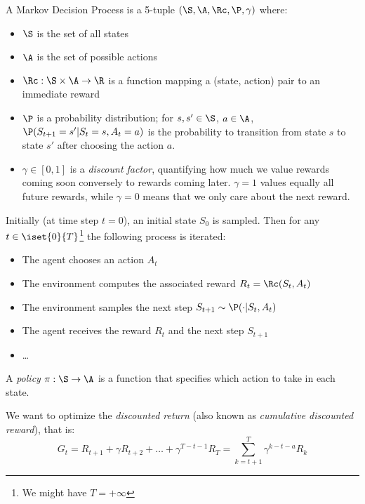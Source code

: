\begin{definition}
    A Markov Decision Process is a 5-tuple $(\S, \A, \Rc, \P, \gamma)$ where:
    \begin{itemize}
        \item $\S$ is the set of all states
        \item $\A$ is the set of possible actions
        \item $\Rc:\S\times\A\to\R$ is a function mapping a (state, action) pair to an immediate reward
        \item $\P$ is a probability distribution; for $s,s'\in\S$, $a\in\A$, $\P(S_{t+1}=s'|S_t=s,A_t=a)$ is the probability to transition from state $s$ to state $s'$ after choosing the action $a$.
        \item $\gamma\in[0,1]$ is a \emph{discount factor}, quantifying how much we value rewards coming soon conversely to rewards coming later. $\gamma=1$ values equally all future rewards, while $\gamma=0$ means that we only care about the next reward.
    \end{itemize}

    Initially (at time step $t=0$), an initial state $S_0$ is sampled. Then for any $t\in\iset{0}{T}$\footnote{We might have $T=+\infty$} the following process is iterated:
    \begin{itemize}
        \item The agent chooses an action $A_t$
        \item The environment computes the associated reward $R_t=\Rc(S_t,A_t)$
        \item The environment samples the next step $S_{t+1}\sim\P(\cdot|S_t,A_t)$
        \item The agent receives the reward $R_t$ and the next step $S_{t+1}$
        \item \dots
    \end{itemize}
\end{definition}

\begin{definition}[Policy]
    A \emph{policy} $\pi:\S\to\A$ is a function that specifies which action to take in each state.
\end{definition}

We want to optimize the \emph{discounted return} (also known as \emph{cumulative discounted reward}), that is:
\begin{equation*}
    G_t=R_{t+1}+\gamma R_{t+2}+\dots+\gamma^{T-t-1}R_T = \sum_{k=t+1}^T\gamma^{k-t-a}R_k
\end{equation*}